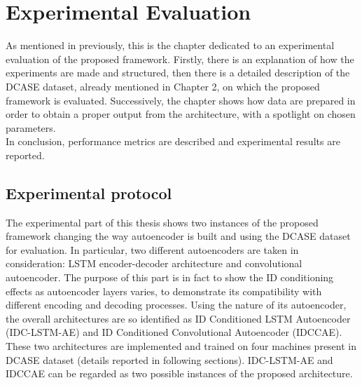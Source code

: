 \chapter{Experimental Evaluation}
As mentioned in previously, this is the chapter dedicated to an experimental evaluation of the proposed framework. Firstly, there is an explanation of how the experiments are made and structured, then there is a detailed description of the DCASE dataset, already mentioned in Chapter 2, on which the proposed framework is evaluated. Successively, the chapter shows how data are prepared in order to obtain a proper output from the architecture, with a spotlight on chosen parameters.\\
In conclusion, performance metrics are described and experimental results are reported.
\section{Experimental protocol}
The experimental part of this thesis shows two instances of the proposed framework changing the way autoencoder is built and using the DCASE dataset for evaluation. In particular, two different autoencoders are taken in consideration: LSTM encoder-decoder architecture and convolutional autoencoder. The purpose of this part is in fact to show the ID conditioning effects as autoencoder layers varies, to demonstrate its compatibility with different encoding and decoding processes. Using the nature of its autoencoder, the overall architectures are so identified as ID Conditioned LSTM Autoencoder (IDC-LSTM-AE) and ID Conditioned Convolutional Autoencoder (IDCCAE). These two architectures are implemented and trained on four machines present in DCASE dataset (details reported in following sections). IDC-LSTM-AE and IDCCAE can be regarded as two possible instances of the proposed architecture.
